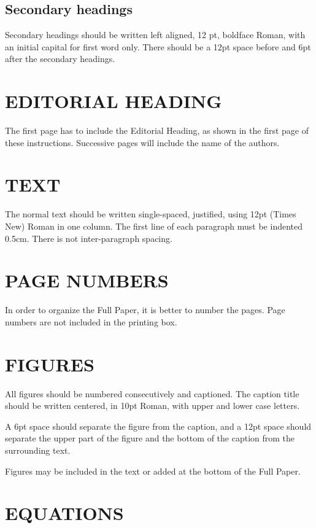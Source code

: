 \documentclass{wccm2024}
\begin{document}
\subsection {Secondary headings}

Secondary headings should be written left aligned, 12 pt, boldface
Roman, with an initial capital for first word only. There should
be a 12pt space before and 6pt after the secondary headings.

\section{EDITORIAL HEADING}

The first page has to include the Editorial Heading, as shown in
the first page of these instructions. Successive pages will
include the name of the authors.

\section{TEXT}

The normal text should be written single-spaced, justified, using
12pt (Times New) Roman in one column. The first line of each
paragraph must be indented 0.5cm. There is not inter-paragraph
spacing.

\section{PAGE NUMBERS}

In order to organize the Full Paper, it is better to number
the pages. Page numbers are not included in the printing box.

\section{FIGURES}

All figures should be numbered consecutively and captioned. The
caption title should be written centered, in 10pt Roman, with
upper and lower case letters.


A 6pt space should separate the figure from the caption, and a
12pt space should separate the upper part of the figure and the
bottom of the caption from the surrounding text.

Figures may be included in the text or added at the bottom of the Full Paper.

\section{EQUATIONS}
\end{document}
